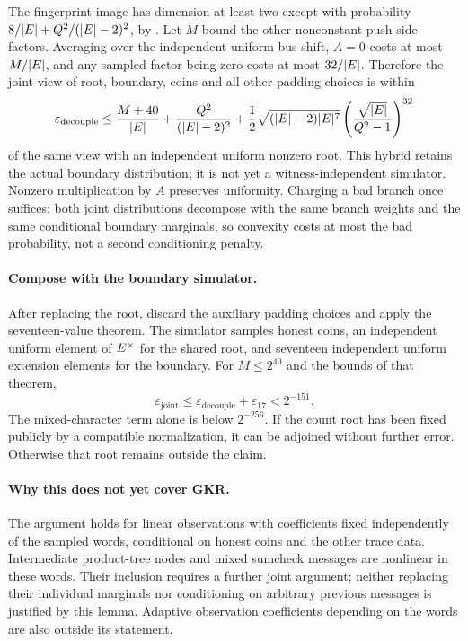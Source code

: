 \documentclass[11pt]{article}
\begin{document}
The fingerprint image has dimension at least two except with probability $8/|E|+Q^2/(|E|-2)^2$, by . Let $M$ bound the other nonconstant push-side factors. Averaging over the independent uniform bus shift, $A=0$ costs at most $M/|E|$, and any sampled factor being zero costs at most $32/|E|$. Therefore the joint view of root, boundary, coins and all other padding choices is within
\[
 \varepsilon_{\mathrm{decouple}}\le
 \frac{M+40}{|E|}+\frac{Q^2}{(|E|-2)^2}
 +\frac12\sqrt{(|E|-2)|E|^7}
 \left(\frac{\sqrt{|E|}}{Q^2-1}\right)^{32}
\]
of the same view with an independent uniform nonzero root. This hybrid retains the actual boundary distribution; it is not yet a witness-independent simulator. Nonzero multiplication by $A$ preserves uniformity. Charging a bad branch once suffices: both joint distributions decompose with the same branch weights and the same conditional boundary marginals, so convexity costs at most the bad probability, not a second conditioning penalty.

\paragraph{Compose with the boundary simulator.} After replacing the root, discard the auxiliary padding choices and apply the seventeen-value theorem. The simulator samples honest coins, an independent uniform element of $E^\times$ for the shared root, and seventeen independent uniform extension elements for the boundary. For $M\le2^{40}$ and the bounds of that theorem,
\[
 \varepsilon_{\mathrm{joint}}\le
 \varepsilon_{\mathrm{decouple}}+\varepsilon_{17}<2^{-151}.
\]
The mixed-character term alone is below $2^{-256}$. If the count root has been fixed publicly by a compatible normalization, it can be adjoined without further error. Otherwise that root remains outside the claim.

\paragraph{Why this does not yet cover GKR.} The argument holds for linear observations with coefficients fixed independently of the sampled words, conditional on honest coins and the other trace data. Intermediate product-tree nodes and mixed sumcheck messages are nonlinear in these words. Their inclusion requires a further joint argument; neither replacing their individual marginals nor conditioning on arbitrary previous messages is justified by this lemma. Adaptive observation coefficients depending on the words are also outside its statement.
\end{document}
